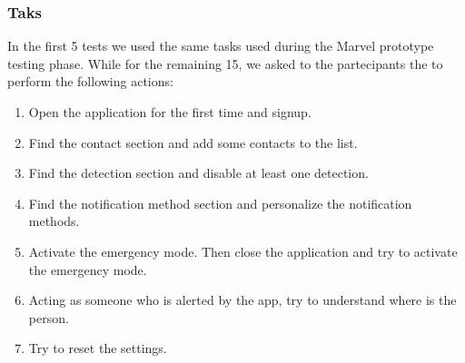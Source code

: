 \documentclass[12pt]{article}
\begin{document}
\subsubsection{Taks}
In the first 5 tests we used the same tasks used during the Marvel prototype
testing phase. While for the remaining 15, we asked to the partecipants
the to perform the following actions:
\begin{enumerate}
    \item Open the application for the first time and signup. 
    \item Find the contact section and add some contacts to the list.
    \item Find the detection section and disable at least one detection.
    \item Find the notification method section and personalize the notification 
    methods.
    \item Activate the emergency mode. Then close the application and 
    try to activate the emergency mode. 
    \item Acting as someone who is alerted by the app, try to understand where 
    is the person.  
    \item Try to reset the settings. 
\end{enumerate}
\end{document}
